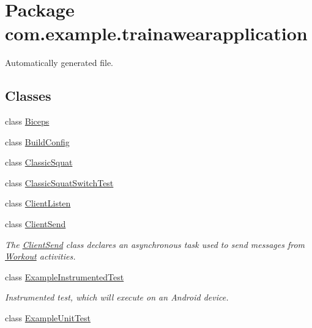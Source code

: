 \hypertarget{namespacecom_1_1example_1_1trainawearapplication}{}\section{Package com.\+example.\+trainawearapplication}
\label{namespacecom_1_1example_1_1trainawearapplication}


Automatically generated file.  


\subsection*{Classes}
\begin{DoxyCompactItemize}
\item 
class \mbox{\hyperlink{classcom_1_1example_1_1trainawearapplication_1_1_biceps}{Biceps}}
\item 
class \mbox{\hyperlink{classcom_1_1example_1_1trainawearapplication_1_1_build_config}{Build\+Config}}
\item 
class \mbox{\hyperlink{classcom_1_1example_1_1trainawearapplication_1_1_classic_squat}{Classic\+Squat}}
\item 
class \mbox{\hyperlink{classcom_1_1example_1_1trainawearapplication_1_1_classic_squat_switch_test}{Classic\+Squat\+Switch\+Test}}
\item 
class \mbox{\hyperlink{classcom_1_1example_1_1trainawearapplication_1_1_client_listen}{Client\+Listen}}
\item 
class \mbox{\hyperlink{classcom_1_1example_1_1trainawearapplication_1_1_client_send}{Client\+Send}}
\begin{DoxyCompactList}\small\item\em The \mbox{\hyperlink{classcom_1_1example_1_1trainawearapplication_1_1_client_send}{Client\+Send}} class declares an asynchronous task used to send messages from \mbox{\hyperlink{classcom_1_1example_1_1trainawearapplication_1_1_workout}{Workout}} activities. \end{DoxyCompactList}\item 
class \mbox{\hyperlink{classcom_1_1example_1_1trainawearapplication_1_1_example_instrumented_test}{Example\+Instrumented\+Test}}
\begin{DoxyCompactList}\small\item\em Instrumented test, which will execute on an Android device. \end{DoxyCompactList}\item 
class \mbox{\hyperlink{classcom_1_1example_1_1trainawearapplication_1_1_example_unit_test}{Example\+Unit\+Test}}

\end{DoxyCompactItemize}
